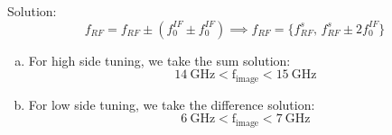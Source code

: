 \begin{homeworkProblem}
\begin{enumerate}[a)]
\begin{callout}{Solution:}
        $$f_{RF} = f_{RF}\pm (f_{0}^{IF} \pm f_{0}^{IF}) \implies f_{RF}=\{ f_{RF}^{s},\, f_{RF}^{s}\pm 2f_{0}^{IF} \}$$

        \begin{enumerate}[(a)]
            \item For high side tuning, we take the sum solution:
                $$\mathrm{14~GHz < f_{image} < 15 ~GHz}$$

            \item For low side tuning, we take the difference solution:
                $$\mathrm{6~GHz < f_{image} < 7 ~GHz}$$
        \end{enumerate}

        \end{callout}
\end{enumerate}
\end{homeworkProblem}
